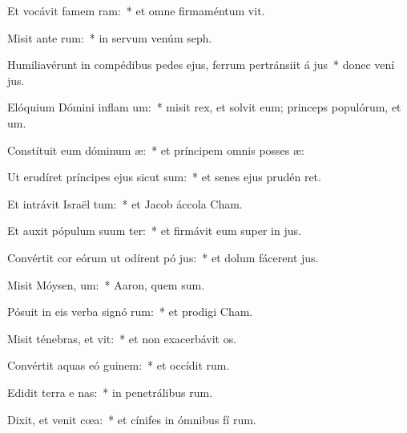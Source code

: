 \item Et vocávit famem  ram:~* et omne firmaméntum  vit.
\item Misit ante  rum:~* in servum venúm  seph.
\item Humiliavérunt in compédibus pedes ejus, ferrum pertránsiit á jus~* donec vení  jus.
\item Elóquium Dómini inflam um:~* misit rex, et solvit eum; princeps populórum, et  um.
\item Constítuit eum dóminum  æ:~* et príncipem omnis posses æ:
\item Ut erudíret príncipes ejus sicut sum:~* et senes ejus prudén ret.
\item Et intrávit Israël  tum:~* et Jacob áccola    Cham.
\item Et auxit pópulum suum ter:~* et firmávit eum super in jus.
\item Convértit cor eórum ut odírent pó jus:~* et dolum fácerent   jus.
\item Misit Móysen,  um:~* Aaron, quem  sum.
\item Pósuit in eis verba signó rum:~* et prodigi   Cham.
\item Misit ténebras, et vit:~* et non exacerbávit  os.
\item Convértit aquas eó  guinem:~* et occídit  rum.
\item Edidit terra e nas:~* in penetrálibus  rum.
\item Dixit, et venit cœa:~* et cínifes in ómnibus fí rum.
